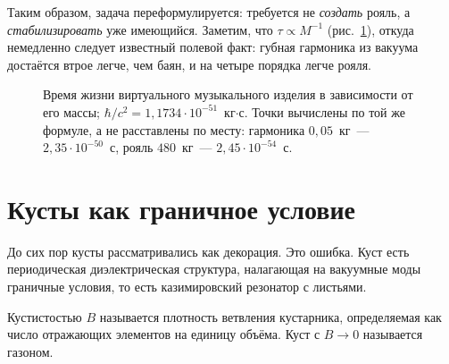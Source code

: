 \documentclass[11pt,a4paper]{article}
\begin{document}
Таким образом, задача переформулируется: требуется не \emph{создать} рояль, а \emph{стабилизировать} уже имеющийся. Заметим, что $\tau\propto M^{-1}$ (рис.~\ref{fig:tau}), откуда немедленно следует известный полевой факт: губная гармоника из вакуума достаётся втрое легче, чем баян, и на четыре порядка легче рояля.

\begin{figure}[htbp]
\centering
{}
\caption{Время жизни виртуального музыкального изделия в зависимости от его массы; $\hbar/c^2 = 1{,}1734\cdot10^{-51}$~кг$\cdot$с. Точки вычислены по той же формуле, а не расставлены по месту: гармоника $0{,}05$~кг~--- $2{,}35\cdot10^{-50}$~с, рояль $480$~кг~--- $2{,}45\cdot10^{-54}$~с.}
\label{fig:tau}
\end{figure}

\section{Кусты как граничное условие}

До сих пор кусты рассматривались как декорация. Это ошибка. Куст есть периодическая диэлектрическая структура, налагающая на вакуумные моды граничные условия, то есть казимировский резонатор с листьями.

\begin{definition}[Кустистость]
Кустистостью $B$ называется плотность ветвления кустарника, определяемая как число отражающих элементов на единицу объёма. Куст с $B \to 0$ называется газоном.
\end{definition}
\end{document}
